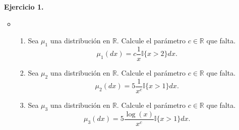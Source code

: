 \documentclass[12pt,a4paper]{article}
\newcommand{\R}{\mathbb{R}}
\begin{document}
 	\begin{enumerate}
 		\item[\textbf{Ejercicio 1.}]$\;$\\
 		\begin{itemize}
 			\item \begin{enumerate}
 				\item Sea $\mu_1$ una distribución en $\R$. Calcule el parámetro $c \in \R$ que falta.
 				$$\mu_1(dx)= c \frac{1}{x}\mathbb{I}\{x>2 \}dx.$$
 					\item Sea $\mu_2$ una distribución en $\R$. Calcule el parámetro $c \in \R$ que falta.
 					$$\mu_2(dx)=5 \frac{1}{x^c}\mathbb{I}\{x>1 \}dx.$$
 						\item Sea $\mu_3$ una distribución en $\R$. Calcule el parámetro $c \in \R$ que falta.
 						$$\mu_3(dx)=5\frac{\log(x)}{x^c}\mathbb{I}\{x>1 \}dx.$$
 				

\end{enumerate}
\end{itemize}
\end{enumerate}
\end{document}
